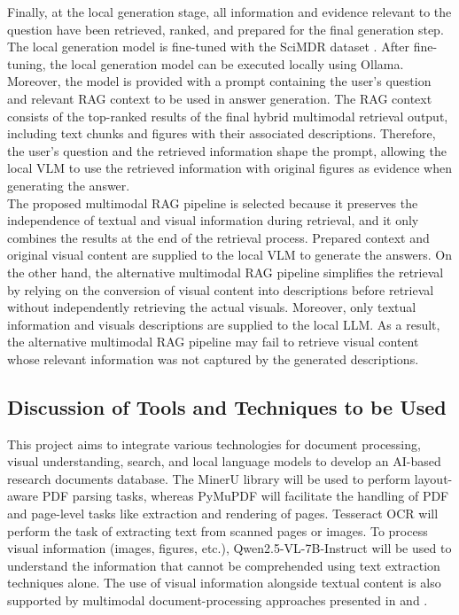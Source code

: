 \documentclass[11pt,a4paper]{report}
\begin{document}
Finally, at the local generation stage, all information and evidence relevant to the question have been retrieved, ranked, and prepared for the final generation step. The local generation model is fine-tuned with the SciMDR dataset \cite{Chen2026SciMDRAS}. After fine-tuning, the local generation model can be executed locally using Ollama. Moreover, the model is provided with a prompt containing the user’s question and relevant \ac{RAG} context to be used in answer generation. The \ac{RAG} context consists of the top-ranked results of the final hybrid multimodal retrieval output, including text chunks and figures with their associated descriptions. Therefore, the user’s question and the retrieved information shape the prompt, allowing the local \ac{VLM} to use the retrieved information with original figures as evidence when generating the answer.\\

The proposed multimodal \ac{RAG} pipeline is selected because it preserves the independence of textual and visual information during retrieval, and it only combines the results at the end of the retrieval process. Prepared context and original visual content are supplied to the local \ac{VLM} to generate the answers. On the other hand, the alternative multimodal \ac{RAG} pipeline simplifies the retrieval by relying on the conversion of visual content into descriptions before retrieval without independently retrieving the actual visuals. Moreover, only textual information and visuals descriptions are supplied to the local \ac{LLM}. As a result, the alternative multimodal \ac{RAG} pipeline may fail to retrieve visual content whose relevant information was not captured by the generated descriptions.

\subsection{Discussion of Tools and Techniques to be Used}
This project aims to integrate various technologies for document processing, visual understanding, search, and local language models to develop an \ac{AI}-based research documents database. The MinerU library \cite{Wang2024MinerUAO} will be used to perform layout-aware PDF parsing tasks, whereas PyMuPDF \cite{artifex2026pymupdf} will facilitate the handling of PDF and page-level tasks like extraction and rendering of pages. Tesseract \ac{OCR} \cite{Smith2007AnOO} will perform the task of extracting text from scanned pages or images. To process visual information (images, figures, etc.), Qwen2.5-VL-7B-Instruct \cite{Bai2025Qwen25VLTR} will be used to understand the information that cannot be comprehended using text extraction techniques alone. The use of visual information alongside textual content is also supported by multimodal document-processing approaches presented in \cite{Tanaka2025VDocRAGRG} and \cite{Chandrasekhar2026MaterialDA}.\\
\end{document}

